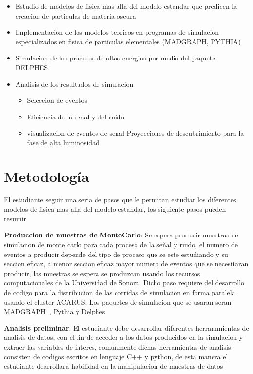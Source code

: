 \begin{itemize}
    \item Estudio de modelos de fisica mas alla del modelo estandar que predicen la creacion de particulas de materia oscura 
    \item Implementacion de los modelos teoricos en programas de simulacion especializados en fisica de particulas elementales (MADGRAPH, PYTHIA)
    \item Simulacion de los procesos de altas energias por medio del paquete DELPHES 
    \item Analisis de los resultados de simulacion
    \begin{itemize}
        \item Seleccion de eventos 
        \item Eficiencia de la senal y del ruido 
        \item visualizacion de eventos de senal 
        \tiem Proyecciones de descubrimiento para la fase de alta luminosidad 
    \end{itemize}
\end{itemize}

\chapter{Metodología}

El estudiante seguir una seria de pasos que le permitan estudiar los diferentes modelos de fisica mas alla del modelo estandar, los siguiente pasos pueden resumir 


{\bf Produccion de muestras de MonteCarlo}: Se espera producir muestras de simulacion de monte carlo para cada proceso de la se\~nal y ruido, el numero de eventos a producir depende del tipo de proceso que se este estudiando y su seccion eficaz, a menor seccion eficaz mayor numero de eventos que se necesitaran producir, las muestras se espera se produzcan usando los recursos computacionales de la Universidad de Sonora. Dicho paso requiere del desarrollo de codigo para la distribucion de las corridas de simulacion en forma paralela usando el cluster ACARUS. Los paquetes de simulacion que se usaran seran MADGRAPH~\cite{Alwall:2007st}, Pythia y Delphes~\cite{deFavereau2014}

{\bf Analisis preliminar}: El estudiante debe desarrollar diferentes herrammientas de analisis de datos, con el fin de acceder a los datos producidos en la simulacion y extraer las variables de interes, comunmente dichas herramientas de analisis consisten de codigos escritos en lenguaje C++ y python, de esta manera el estudiante dearrollara habilidad en la manipulacion de muestras de datos 

